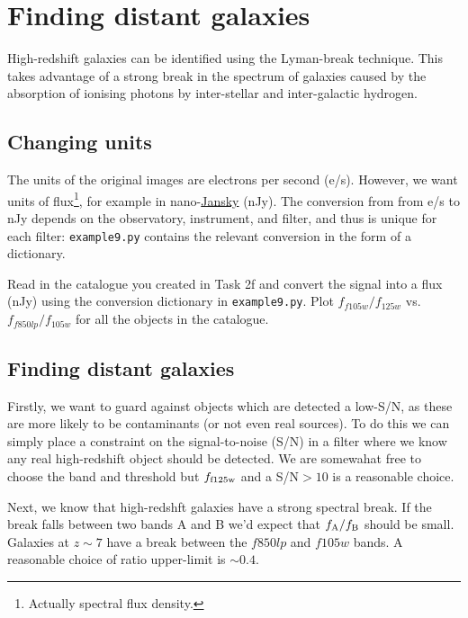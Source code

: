 \documentclass{article}
\begin{document}
\setcounter{Question}{0}
\section{Finding distant galaxies}

High-redshift galaxies can be identified using the Lyman-break technique. This takes advantage of a strong break in the spectrum of galaxies caused by the absorption of ionising photons by inter-stellar and inter-galactic hydrogen.

\subsection{Changing units}

The units of the original images are electrons per second (e/s). However, we want units of flux\footnote{Actually spectral flux density.}, for example in nano-\href{https://en.wikipedia.org/wiki/Jansky}{Jansky} (nJy). The conversion from from e/s to nJy depends on the observatory, instrument, and filter, and thus is unique for each filter: \texttt{example9.py} contains the relevant conversion in the form of a dictionary.

\begin{question}
Read in the catalogue you created in Task 2f and convert the signal into a flux (nJy) using the conversion dictionary in \texttt{example9.py}. Plot $f_{f105w}/f_{125w}$ vs. $f_{f850lp}/f_{105w}$ for all the objects in the catalogue.
\end{question}


\subsection{Finding distant galaxies}


Firstly, we want to guard against objects which are detected a low-S/N, as these are more likely to be contaminants (or not even real sources). To do this we can simply place a constraint on the signal-to-noise (S/N) in a filter where we know any real high-redshift object should be detected. We are somewahat free to choose the band and threshold but $f_{\rm f125w}$ and a S/N$>10$ is a reasonable choice.

Next, we know that high-redshft galaxies have a strong spectral break. If the break falls between two bands A and B we'd expect that $f_{\rm A}/f_{\rm B}$ should be small. Galaxies at $z\sim 7$ have a break between the $f850lp$ and $f105w$ bands. A reasonable choice of ratio upper-limit is $\sim 0.4$.
\end{document}
